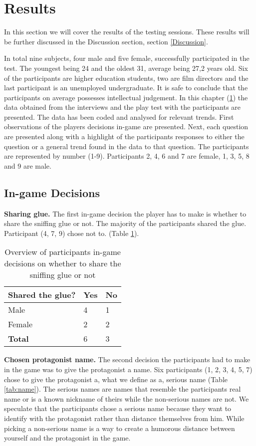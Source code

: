 \section{Results} \label{Results}
In this section we will cover the results of the testing sessions. These results will be further discussed in the Discussion section, section \ref{Discussion}.\

In total nine subjects, four male and five female, successfully participated in the test. The youngest being 24 and the oldest 31, average being 27,2 years old. Six of the participants are higher education students, two are film directors and the last participant is an unemployed undergraduate. It is safe to conclude that the participants on average possesses intellectual judgement. In this chapter (\ref{Results}) the data obtained from the interviews and the play test with the participants are presented. The data has been coded and analysed for relevant trends. First observations of the players decisions in-game are presented. Next, each question are presented along with a highlight of the participants responses to either the question or a general trend found in the data to that question. The participants are represented by number (1-9). Participants 2, 4, 6 and 7 are female, 1, 3, 5, 8 and 9 are male. 

\subsection{In-game Decisions} \label{ingamedec}

\textbf{Sharing glue.} The first in-game decision the player has to make is whether to share the sniffing glue or not. The majority of the participants shared the glue. Participant (4, 7, 9) chose not to. (Table \ref{tab:glue}).

\begin{table}[h]
\centering
\begin{tabular}{l l l}
\hline
\textbf{Shared the glue?} & Yes & No \\
\hline
Male & 4 & 1 \\
Female & 2 & 2 \\
\textbf{Total} & 6 & 3 \\
\hline
\end{tabular}
\caption{\label{tab:glue}Overview of participants in-game decisions on whether to share the sniffing glue or not}
\end{table}


\textbf{Chosen protagonist name.} The second decision the participants had to make in the game was to give the protagonist a name. Six participants (1, 2, 3, 4, 5, 7) chose to give the protagonist a, what we define as a, serious name (Table \ref{tab:name}). The serious names are names that resemble the participants real name or is a known nickname of theirs while the non-serious names are not. We speculate that the participants chose a serious name because they want to identify with the protagonist rather than distance themselves from him. While picking a non-serious name is a way to create a humorous distance between yourself and the protagonist in the game.

